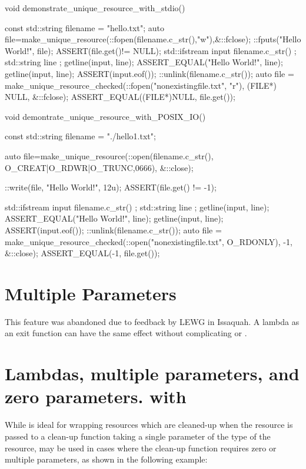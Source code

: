 \documentclass[ebook,11pt,article]{memoir}
\begin{document}
\begin{codeblock}
void demonstrate_unique_resource_with_stdio() 
{
	const std::string filename = "hello.txt";
	{
		auto file=make_unique_resource(::fopen(filename.c_str(),"w"),&::fclose);
		::fputs("Hello World!\n", file);
		ASSERT(file.get()!= NULL);
	}
	{
		std::ifstream input { filename.c_str() };
		std::string line { };
		getline(input, line);
		ASSERT_EQUAL("Hello World!", line);
		getline(input, line);
		ASSERT(input.eof());
	}
	::unlink(filename.c_str());
	{
		auto file = make_unique_resource_checked(::fopen("nonexistingfile.txt", "r"), 
		            (FILE*) NULL, &::fclose);
		ASSERT_EQUAL((FILE*)NULL, file.get());
	}

}
\end{codeblock}

\newpage
\begin{codeblock}
void demontrate_unique_resource_with_POSIX_IO() 
{
	const std::string filename = "./hello1.txt";
	{
		auto file=make_unique_resource(::open(filename.c_str(),
                     O_CREAT|O_RDWR|O_TRUNC,0666), &::close);
		
		::write(file, "Hello World!\n", 12u);
		ASSERT(file.get() != -1);
	}
	{
		std::ifstream input { filename.c_str() };
		std::string line { };
		getline(input, line);
		ASSERT_EQUAL("Hello World!", line);
		getline(input, line);
		ASSERT(input.eof());
	}
	::unlink(filename.c_str());
	{
		auto file = make_unique_resource_checked(::open("nonexistingfile.txt", 
                       O_RDONLY), -1, &::close);
		ASSERT_EQUAL(-1, file.get());
	}

}\end{codeblock}
\newpage
\section{Multiple Parameters}
This feature was abandoned due to feedback by LEWG in Issaquah. A lambda as an exit function can have the same effect without complicating  or .

\section{Lambdas, multiple parameters, and zero parameters. with }
While  is ideal for wrapping resources which are cleaned-up when the resource is passed to a clean-up function taking a single parameter of the type of the resource,  may be used in cases where the clean-up function requires zero or multiple parameters, as shown in the following example:
\end{document}

